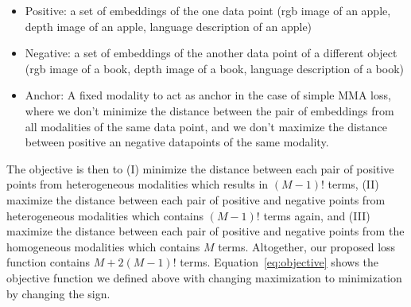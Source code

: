 \documentclass[sigconf,natbib=true,anonymous=true]{acmart}
\begin{document}
\begin{itemize}
    \item Positive: a set of embeddings of the one data point (rgb image of an apple, depth image of an apple, language description of an apple)
    \item Negative: a set of embeddings of the another data point of a different object (rgb image of a book, depth image of a book, language description of a book)
    \item Anchor: A fixed modality to act as anchor in the case of simple MMA loss, where we don't minimize the distance between the pair of embeddings from all modalities of the same data point, and we don't maximize the distance between positive an negative datapoints of the same modality.
\end{itemize}

The objective is then to (I) minimize the distance between each pair of positive points from heterogeneous modalities which results in $(M-1)!$ terms, (II) maximize the distance between each pair of positive and negative points from heterogeneous modalities which contains $(M-1)!$ terms again, and (III) maximize the distance between each pair of positive and negative points from the homogeneous modalities which contains $M$ terms. Altogether, our proposed loss function contains $M+2(M-1)!$ terms.
Equation~\ref{eq:objective} shows the objective function we defined above with changing maximization to minimization by changing the sign.



\end{document}
